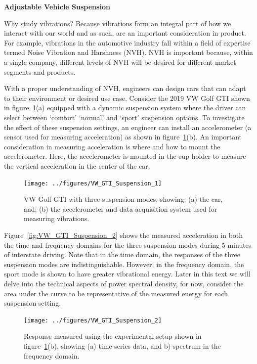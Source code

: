 \documentclass[12pt,letter]{article}
\begin{document}
		\begin{vibration_case_study}

			\textbf{Adjustable Vehicle Suspension}

			\noindent Why study vibrations? Because vibrations form an integral part of how we interact with our world and as such, are an important consideration in product. For example, vibrations in the automotive industry fall within a field of expertise termed Noise Vibration and Harshness (NVH). NVH is important because, within a single company, different levels of NVH will be desired for different market segments and products. 
			
			With a proper understanding of NVH, engineers can design cars that can adapt to their environment or desired use case. Consider the 2019 VW Golf GTI shown in figure~\ref{fig:VW_GTI_Suspension_1}(a) equipped with a dynamic suspension system where the driver can select between `comfort' `normal' and `sport' suspension options. To investigate the effect of these suspension settings, an engineer can install an accelerometer (a sensor used for measuring acceleration) as shown in figure~\ref{fig:VW_GTI_Suspension_1}(b). An important consideration in measuring acceleration is where and how to mount the accelerometer. Here, the accelerometer is mounted in the cup holder to measure the vertical acceleration in the center of the car. 
			\begin{figure}[H]
				\centering
				\texttt{[image: ../figures/VW\_GTI\_Suspension\_1]}
				\caption{VW Golf GTI with three suspension modes, showing: (a) the car, and; (b) the accelerometer and data acquisition system used for measuring vibrations.}
				\label{fig:VW_GTI_Suspension_1}
			\end{figure}
			Figure~\ref{fig:VW_GTI_Suspension_2} shows the measured acceleration in both the time and frequency domains for the three suspension modes during 5 minutes of interstate driving. Note that in the time domain, the responses of the three suspension modes are indistinguishable. However, in the frequency domain, the sport mode is shown to have greater vibrational energy. Later in this text we will delve into the technical aspects of power spectral density, for now, consider the area under the curve to be representative of the measured energy for each suspension setting. 
			\begin{figure}[H]
				\centering
				\texttt{[image: ../figures/VW\_GTI\_Suspension\_2]}
				\vspace{-1.5ex}
				\caption{Response measured using the experimental setup shown in figure~\ref{fig:VW_GTI_Suspension_1}(b), showing (a) time-series data, and b) spectrum in the frequency domain.}

\end{figure}
\end{vibration_case_study}
\end{document}
